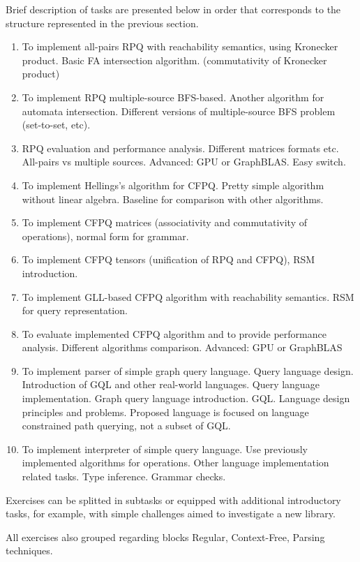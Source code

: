 \documentclass[sigconf]{acmart}
\begin{document}
Brief description of tasks are presented below in order that corresponds to the structure represented in the previous section.
\begin{enumerate}
  \item To implement all-pairs RPQ with reachability semantics, using Kronecker product. Basic FA intersection algorithm. (commutativity of Kronecker product)
  \item To implement RPQ multiple-source BFS-based. Another algorithm for automata intersection. Different versions of multiple-source BFS problem (set-to-set, etc).
  \item RPQ evaluation and performance analysis. Different matrices formats etc. All-pairs vs multiple sources. Advanced: GPU or GraphBLAS. Easy switch.
  \item To implement Hellings's algorithm for CFPQ. Pretty simple algorithm without linear algebra. Baseline for comparison with other algorithms. 
  \item To implement CFPQ matrices (associativity and commutativity of operations), normal form for grammar.
  \item To implement CFPQ tensors (unification of RPQ and CFPQ), RSM introduction.
  \item To implement GLL-based CFPQ algorithm with reachability semantics. RSM for query representation. 
  \item To evaluate implemented CFPQ algorithm and to provide performance analysis. Different algorithms comparison. Advanced: GPU or GraphBLAS 
  \item To implement parser of simple graph query language. Query language design. Introduction of GQL and other real-world languages. Query language implementation. Graph query language introduction. GQL. Language design principles and problems. Proposed language is focused on language constrained path querying, not a subset of GQL.
  \item To implement interpreter of simple query language. Use previously implemented algorithms for operations. Other language implementation related tasks. Type inference. Grammar checks.
\end{enumerate}

Exercises can be splitted in subtasks or equipped with additional introductory tasks, for example, with simple challenges aimed to investigate a new library.

All exercises also grouped regarding blocks Regular, Context-Free, Parsing techniques.
\end{document}
